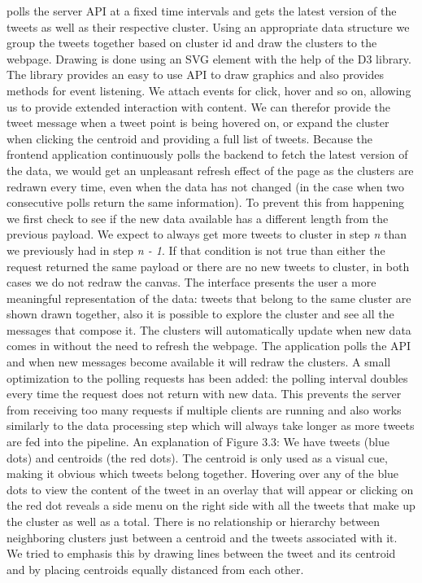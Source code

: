 {\frontend}  polls the server API at a fixed time intervals and gets the latest version of the tweets as well as their respective cluster. Using an appropriate data structure we group the tweets together based on cluster id and draw the clusters to the webpage. Drawing is done using an SVG element with the help of the D3 library. The library provides an easy to use API to draw graphics and also provides methods for event listening. We attach events for click, hover and so on, allowing us to provide extended interaction with content. We can therefor provide the tweet message when a tweet point is being hovered on, or expand the cluster when clicking the centroid and providing a full list of tweets.
\newline
Because the frontend application continuously polls the backend to fetch the latest version of the data, we would get an unpleasant refresh effect of the page as the clusters are redrawn every time, even when the data has not changed (in the case when two consecutive polls return the same information). To prevent this from happening we first check to see if the new data available has a different length from the previous payload. We expect to always get more tweets to cluster in step \textit{n} than we previously had in step \textit{n - 1}. If that condition is not true than either the request returned the same payload or there are no new tweets to cluster, in both cases we do not redraw the canvas.
\newline
The interface presents the user a more meaningful representation of the data: tweets that belong to the same cluster are shown drawn together, also it is possible to explore the cluster and see all the messages that compose it.
\newline
The clusters will automatically update when new data comes in without the need to refresh the webpage. The application polls the API and when new messages become available it will redraw the clusters. A small optimization to the polling requests has been added: the polling interval doubles every time the request does not return with new data. This prevents the server from receiving too many requests if multiple {\frontend}  clients are running and also works similarly to the data processing step which will always take longer as more tweets are fed into the pipeline.
\newline
An explanation of Figure 3.3: We have tweets (blue dots) and centroids (the red dots). The centroid is only used as a visual cue, making it obvious which tweets belong together. Hovering over any of the blue dots to view the content of the tweet in an overlay that will appear or clicking on the red dot reveals a side menu on the right side with all the tweets that make up the cluster as well as a total. There is no relationship or hierarchy between neighboring clusters just between a centroid and the tweets associated with it. We tried to emphasis this by drawing lines between the tweet and its centroid and by placing centroids equally distanced from each other.
